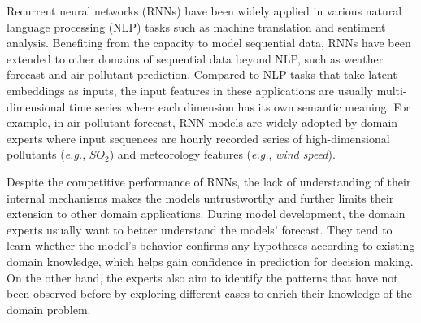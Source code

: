 \label{section:introduction}
Recurrent neural networks (RNNs) have been widely applied in various natural language processing (NLP) tasks such as machine translation and sentiment analysis. 
Benefiting from the capacity to model sequential data, RNNs have been extended to other domains of sequential data beyond NLP, such as weather forecast\cite{xingjian2015convolutional} and air pollutant prediction\cite{oprea2016neural}. 
Compared to NLP tasks that take latent embeddings as inputs, the input features in these applications are usually multi-dimensional time series where each dimension has its own semantic meaning.
For example, in air pollutant forecast, RNN models are widely adopted by domain experts where input sequences are hourly recorded series of high-dimensional pollutants (\emph{e.g.}, $SO_{2}$) and meteorology features (\emph{e.g.}, \textit{wind speed}).

Despite the competitive performance of RNNs, the lack of understanding of their internal mechanisms makes the models untrustworthy and further limits their extension to other domain applications. 
During model development, the domain experts usually want to better understand the models' forecast.
They tend to learn whether the model's behavior confirms any hypotheses according to existing domain knowledge, which helps gain confidence in prediction for decision making.
On the other hand, the experts also aim to identify the patterns that have not been observed before by exploring different cases to enrich their knowledge of the domain problem.

